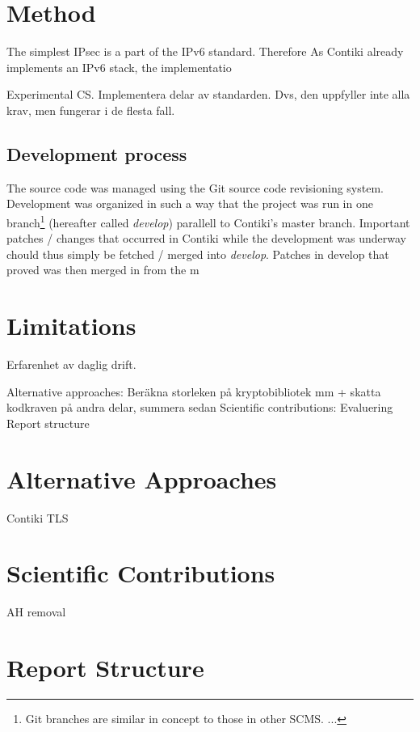 \documentclass[final,letterpaper,twoside,12pt,twocolumn]{report}
\begin{document}
\section{Method}
The simplest 
IPsec is a part of the IPv6 standard. Therefore
As Contiki already implements an IPv6 stack, the implementatio

   Experimental CS. Implementera delar av standarden. Dvs, den uppfyller inte alla krav, men fungerar i de flesta fall.

\subsection{Development process}
The source code was managed using the Git source code revisioning system. Development was organized in such a way that the project was run in one branch\footnote{Git branches are similar in concept to those in other SCMS. ...} (hereafter called \emph{develop}) parallell to Contiki's master branch. Important patches / changes that occurred in Contiki while the development was underway chould thus simply be fetched / merged into \emph{develop}. Patches in develop that proved  was then merged in from the m
	
\section{Limitations}                                                                                                                                                                                                                              
Erfarenhet av daglig drift. 
	
	Alternative approaches: Beräkna storleken på kryptobibliotek mm + skatta kodkraven på andra delar, summera sedan
	Scientific contributions: Evaluering
	Report structure

\section{Alternative Approaches}
	Contiki TLS

\section{Scientific Contributions}
AH removal

\section{Report Structure}
\end{document}
